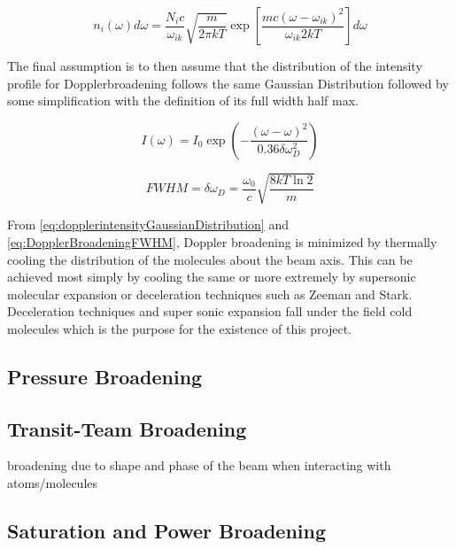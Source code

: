 \documentclass[11pt,a4paper]{book}
\begin{document}
\begin{equation}
\label{eq:EigenFrequencyGaussianDistribution}
n_i(\omega)d\omega = \dfrac{N_i c}{\omega_{ik}} \sqrt{\dfrac{m}{2 \pi k T }} \exp{\left[\frac{m c (\omega-\omega_{ik})^2}{\omega_{ik} 2kT}\right]} d\omega
\end{equation}

The final assumption is to then assume that the distribution of the intensity profile for Dopplerbroadening follows the same Gaussian Distribution followed by some simplification with the definition of its full width half max.

\begin{equation}
\label{eq:dopplerintensityGaussianDistribution}
I(\omega)=I_0 \exp{\left(-\dfrac{(\omega-\omega)^2}{0.36 \delta \omega_{D}^2}\right)}
\end{equation}

\begin{equation}
\label{eq:DopplerBroadeningFWHM}
FWHM=\delta \omega_D =\dfrac{\omega_0}{c} \sqrt{\dfrac{8kT\ln{2}}{m}}
\end{equation}

From \autoref{eq:dopplerintensityGaussianDistribution} and \autoref{eq:DopplerBroadeningFWHM}, Doppler broadening is minimized by thermally cooling the distribution of the molecules about the beam axis. This can be achieved most simply by cooling the same or more extremely by supersonic molecular expansion or deceleration techniques such as Zeeman and Stark. Deceleration techniques and super sonic expansion fall under the field cold molecules which is the purpose for the existence of this project.
\subsection{Pressure Broadening}
\subsection{Transit-Team Broadening}
broadening due to shape and phase of the beam when interacting with atoms/molecules

\subsection{Saturation and Power Broadening}
\end{document}
